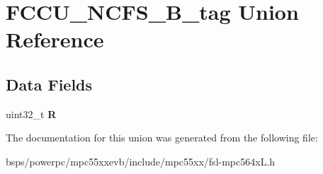 \hypertarget{unionFCCU__NCFS__32B__tag}{}\section{F\+C\+C\+U\+\_\+\+N\+C\+F\+S\+\_\+B\+\_\+tag Union Reference}
\label{unionFCCU__NCFS__32B__tag}
\subsection*{Data Fields}
\begin{DoxyCompactItemize}
\item 
\mbox{\label{unionFCCU__NCFS__32B__tag_afce3f734786ee5129ccd9af0be2bbe29}} 
uint32\+\_\+t {\bfseries R}
\end{DoxyCompactItemize}


The documentation for this union was generated from the following file\+:\begin{DoxyCompactItemize}
\item 
bsps/powerpc/mpc55xxevb/include/mpc55xx/fsl-\/mpc564x\+L.\+h\end{DoxyCompactItemize}
